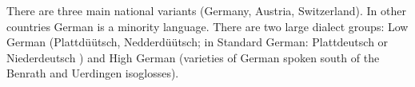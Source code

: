 
There are three main national variants (Germany, Austria, Switzerland). In other countries German is
a minority language. There are two large dialect groups: Low German (Plattdüütsch,
Nedderdüütsch; in Standard German: Platt\-deutsch or Nie\-der\-deutsch%
) and High German (varieties of German spoken south of the Benrath and Uerdingen
isoglosses).






